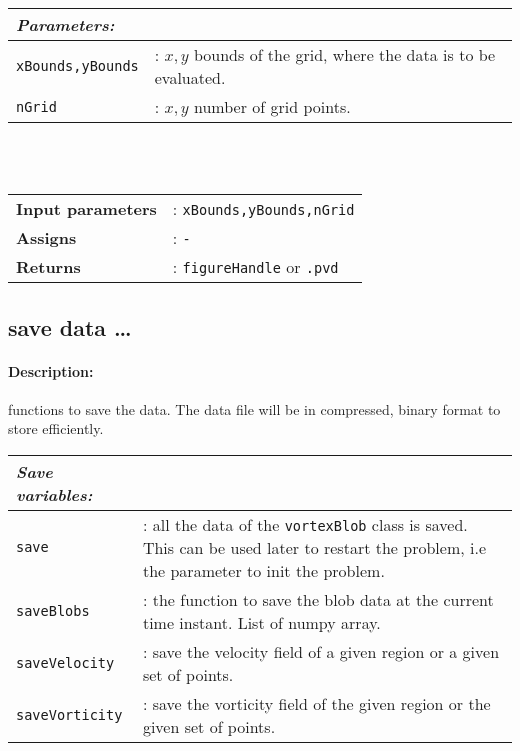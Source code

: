 		\begin{tabular}{lp{10cm}}
			\textit{Parameters:} & \\ \hline
			\texttt{xBounds,yBounds} &: $x,y$ bounds of the grid, where the data is to be evaluated.\\ 
			\texttt{nGrid} &: $x,y$ number of grid points.\\
		\end{tabular} \vspace{5 mm}\\
	\\
	\begin{tabular}{lp{10cm}}
		\textbf{Input parameters} &: \texttt{xBounds,yBounds,nGrid}\\
		\textbf{Assigns} &: \texttt{-}\\ 			
		\textbf{Returns} &: \texttt{figureHandle} or \texttt{.pvd}\\ 					
	\end{tabular}	

\subsection{save data \ldots}
	\paragraph{Description:} functions to save the data. The data file will be in compressed, binary format to store efficiently.\\

		\begin{tabular}{lp{10cm}}
			\textit{Save variables:} & \\ \hline
			\texttt{save} &: all the data of the \texttt{vortexBlob} class is saved. This can be used later to restart the problem, i.e the parameter to init the problem.\\
			\texttt{saveBlobs} &: the function to save the blob data at the current time instant. List of numpy array.\\ 			
			\texttt{saveVelocity} &: save the velocity field of a given region or a given set of points.\\ 
			\texttt{saveVorticity} &: save the vorticity field of the given region or the given set of points.\\ 
		\end{tabular} \vspace{5 mm}
	
